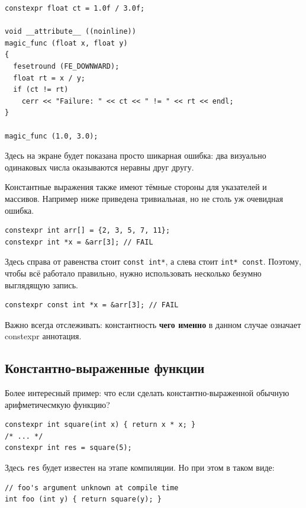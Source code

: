 \documentclass[a4paper,12pt,oneside]{book}
\begin{document}
\begin{lstlisting}
constexpr float ct = 1.0f / 3.0f;

void __attribute__ ((noinline))
magic_func (float x, float y)
{
  fesetround (FE_DOWNWARD);
  float rt = x / y;
  if (ct != rt) 
    cerr << "Failure: " << ct << " != " << rt << endl;  
}

magic_func (1.0, 3.0);
\end{lstlisting}

Здесь на экране будет показана просто шикарная ошибка: два визуально одинаковых числа оказываются неравны друг другу.

Константные выражения также имеют тёмные стороны для указателей и массивов. Например ниже приведена тривиальная, но не столь уж очевидная ошибка.

\begin{lstlisting}
constexpr int arr[] = {2, 3, 5, 7, 11};
constexpr int *x = &arr[3]; // FAIL
\end{lstlisting}

Здесь справа от равенства стоит \lstinline!const int*!, а слева стоит \lstinline!int* const!. Поэтому, чтобы всё работало правильно, нужно использовать несколько безумно выглядящую запись.

\begin{lstlisting}
constexpr const int *x = &arr[3]; // FAIL
\end{lstlisting}

Важно всегда отслеживать: константность \textbf{чего именно} в данном случае означает constexpr аннотация.

\subsection{Константно-выраженные функции}\label{Constexpr:functions}

Более интересный пример: что если сделать константно-выраженной обычную арифметичесмкую функцию?

\begin{lstlisting}
constexpr int square(int x) { return x * x; }
/* ... */
constexpr int res = square(5);
\end{lstlisting}

Здесь \lstinline!res! будет известен на этапе компиляции. Но при этом в таком виде:

\begin{lstlisting}
// foo's argument unknown at compile time
int foo (int y) { return square(y); }
\end{lstlisting}
\end{document}

